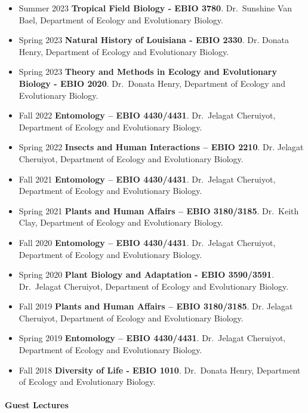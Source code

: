 \documentclass[11pt,a4paper,]{awesome-cv}
\begin{document}
\begin{itemize}
\item
  Summer 2023 \textbar{} \textbf{Tropical Field Biology - EBIO 3780}.
  Dr.~Sunshine Van Bael, Department of Ecology and Evolutionary Biology.
\item
  Spring 2023 \textbar{} \textbf{Natural History of Louisiana - EBIO
  2330}. Dr. Donata Henry, Department of Ecology and Evolutionary
  Biology.
\item
  Spring 2023 \textbar{} \textbf{Theory and Methods in Ecology and
  Evolutionary Biology - EBIO 2020}. Dr.~Donata Henry, Department of
  Ecology and Evolutionary Biology.
\item
  Fall 2022 \textbar{} \textbf{Entomology -- EBIO 4430/4431}.
  Dr.~Jelagat Cheruiyot, Department of Ecology and Evolutionary Biology.
\item
  Spring 2022 \textbar{} \textbf{Insects and Human Interactions -- EBIO
  2210}. Dr. Jelagat Cheruiyot, Department of Ecology and Evolutionary
  Biology.
\item
  Fall 2021 \textbar{} \textbf{Entomology -- EBIO 4430/4431}.
  Dr.~Jelagat Cheruiyot, Department of Ecology and Evolutionary Biology.
\item
  Spring 2021 \textbar{} \textbf{Plants and Human Affairs -- EBIO
  3180/3185}. Dr.~Keith Clay, Department of Ecology and Evolutionary
  Biology.
\item
  Fall 2020 \textbar{} \textbf{Entomology -- EBIO 4430/4431}.
  Dr.~Jelagat Cheruiyot, Department of Ecology and Evolutionary Biology.
\item
  Spring 2020 \textbar{} \textbf{Plant Biology and Adaptation - EBIO
  3590/3591}. Dr.~Jelagat Cheruiyot, Department of Ecology and
  Evolutionary Biology.
\item
  Fall 2019 \textbar{} \textbf{Plants and Human Affairs -- EBIO
  3180/3185}. Dr. Jelagat Cheruiyot, Department of Ecology and
  Evolutionary Biology.
\item
  Spring 2019 \textbar{} \textbf{Entomology -- EBIO 4430/4431}.
  Dr.~Jelagat Cheruiyot, Department of Ecology and Evolutionary Biology.
\item
  Fall 2018 \textbar{} \textbf{Diversity of Life - EBIO 1010}.
  Dr.~Donata Henry, Department of Ecology and Evolutionary Biology.
\end{itemize}

\paragraph{Guest Lectures}\label{guest-lectures}
\end{document}
